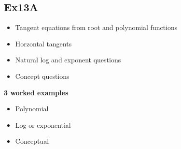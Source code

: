 \documentclass[11pt]{report}
\begin{document}
\newpage
\subsection{Ex13A}
\begin{itemize}
	\item Tangent equations from root and polynomial functions
	\item Horzontal tangents
	\item Natural log and exponent questions
	\item Concept questions 
\end{itemize}

\textbf{3 worked examples} 
\begin{itemize}
	\item Polynomial
	\item Log or exponential
	\item Conceptual
\end{itemize}
\newpage
 
\newpage
\end{document}
